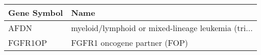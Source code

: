 \begin{tabular}{ll}
\toprule
Gene Symbol &                                               Name \\
\midrule
       AFDN & myeloid/lymphoid or mixed-lineage leukemia (tri... \\
    FGFR1OP &                       FGFR1 oncogene partner (FOP) \\
\bottomrule
\end{tabular}
